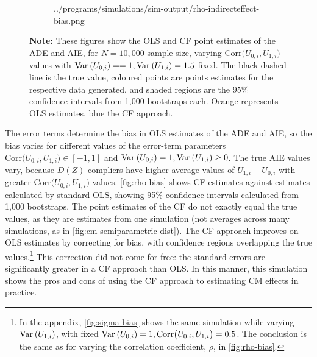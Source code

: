 \begin{figure}[h!]
\begin{subfigure}[c]{0.475\textwidth}
{            ../programs/simulations/sim-output/rho-indirecteffect-bias.png}
    \end{subfigure}
    \label{fig:rho-bias}
    \justify
    \footnotesize    
    \textbf{Note:}
    These figures show the OLS and CF point estimates of the ADE and AIE, for $N = 10,000$ sample size, varying $\text{Corr}\big(U_{0,i}, U_{1,i}\big)$ values with $\text{Var}_{} \left( U_{0,i} \right) = = 1, \text{Var}_{} \left( U_{1,i} \right) = 1.5$ fixed.
    The black dashed line is the true value, coloured points are points estimates for the respective data generated, and shaded regions are the 95\% confidence intervals from 1,000 bootstraps each.
    Orange represents OLS estimates, blue the CF approach.
\end{figure}

The error terms determine the bias in OLS estimates of the ADE and AIE, so the bias varies for different values of the error-term parameters $\text{Corr}\big(U_{0,i}, U_{1,i}\big) \in [-1, 1]$ and $\text{Var}_{} \left( U_{0,i} \right) = 1, \text{Var}_{} \left( U_{1,i} \right) \geq 0$.
The true AIE values vary, because $D(Z)$ compliers have higher average values of $U_{1,i} - U_{0,i}$ with greater $\text{Corr}\big(U_{0,i}, U_{1,i}\big)$ values.
\autoref{fig:rho-bias} shows CF estimates against estimates calculated by standard OLS, showing 95\% confidence intervals calculated from 1,000 bootstraps.
The point estimates of the CF do not exactly equal the true values, as they are estimates from one simulation (not averages across many simulations, as in \autoref{fig:cm-semiparametric-dist}).
The CF approach improves on OLS estimates by correcting for bias, with confidence regions overlapping the true values.\footnote{
    In the appendix, \autoref{fig:sigma-bias} shows the same simulation while varying $\text{Var}_{} \left( U_{1,i} \right)$, with fixed $\text{Var}_{} \left( U_{0,i} \right) = 1, \text{Corr}\big(U_{0,i}, U_{1,i}\big) = 0.5$.
    The conclusion is the same as for varying the correlation coefficient, $\rho$, in \autoref{fig:rho-bias}.
}
This correction did not come for free: the standard errors are significantly greater in a CF approach than OLS.
In this manner, this simulation shows the pros and cons of using the CF approach to estimating CM effects in practice.
